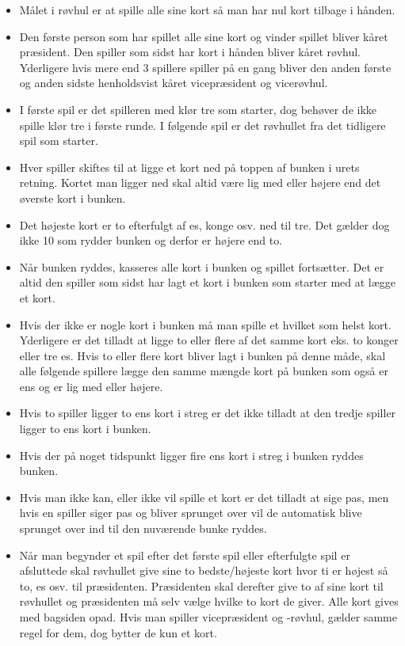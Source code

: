 \documentclass[a4paper, 12pt]{article}
\begin{document}
\begin{multicols}{2}
\begin{itemize}
    \item Målet i røvhul er at spille alle sine kort så man har nul kort tilbage i hånden.
    \item Den første person som har spillet alle sine kort og vinder spillet bliver kåret præsident. Den spiller som sidst har kort i hånden bliver kåret røvhul. Yderligere hvis mere end 3 spillere spiller på en gang bliver den anden første og anden sidste henholdsvist kåret vicepræsident og vicerøvhul.
    \item I første spil er det spilleren med klør tre som starter, dog behøver de ikke spille klør tre i første runde. I følgende spil er det røvhullet fra det tidligere spil som starter.
    \item Hver spiller skiftes til at ligge et kort ned på toppen af bunken i urets retning. Kortet man ligger ned skal altid være lig med eller højere end det øverste kort i bunken. 
    \item Det højeste kort er to efterfulgt af es, konge osv. ned til tre. Det gælder dog ikke 10 som rydder bunken og derfor er højere end to.
    \item Når bunken ryddes, kasseres alle kort i bunken og spillet fortsætter. Det er altid den spiller som sidst har lagt et kort i bunken som starter med at lægge et kort.
    \item Hvis der ikke er nogle kort i bunken må man spille et hvilket som helst kort. Yderligere er det tilladt at ligge to eller flere af det samme kort eks. to konger eller tre es. Hvis to eller flere kort bliver lagt i bunken på denne måde, skal alle følgende spillere lægge den samme mængde kort på bunken som også er ens og er lig med eller højere.
    \item Hvis to spiller ligger to ens kort i streg er det ikke tilladt at den tredje spiller ligger to ens kort i bunken.
    \item Hvis der på noget tidspunkt ligger fire ens kort i streg i bunken ryddes bunken.
    \item Hvis man ikke kan, eller ikke vil spille et kort er det tilladt at sige pas, men hvis en spiller siger pas og bliver sprunget over vil de automatisk blive sprunget over ind til den nuværende bunke ryddes.
    \pagebreak
    \item Når man begynder et spil efter det første spil eller efterfulgte spil er afsluttede skal røvhullet give sine to bedste/højeste kort hvor ti er højest så to, es osv. til præsidenten. Præsidenten skal derefter give to af sine kort til røvhullet og præsidenten må selv vælge hvilke to kort de giver. Alle kort gives med bagsiden opad. Hvis man spiller vicepræsident og -røvhul, gælder samme regel for dem, dog bytter de kun et kort. 
\end{itemize}
\bigbreak


\end{multicols}
\end{document}
